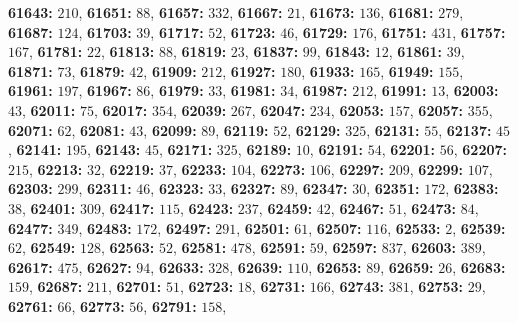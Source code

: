 \textsf{\bfseries 61643:} $210$, \textsf{\bfseries 61651:} $88$, \textsf{\bfseries 61657:} $332$, \textsf{\bfseries 61667:} $21$, \textsf{\bfseries 61673:} $136$, \textsf{\bfseries 61681:} $279$, \textsf{\bfseries 61687:} $124$, \textsf{\bfseries 61703:} $39$, \textsf{\bfseries 61717:} $52$, \textsf{\bfseries 61723:} $46$, \textsf{\bfseries 61729:} $176$, \textsf{\bfseries 61751:} $431$, \textsf{\bfseries 61757:} $167$, \textsf{\bfseries 61781:} $22$, \textsf{\bfseries 61813:} $88$, \textsf{\bfseries 61819:} $23$, \textsf{\bfseries 61837:} $99$, \textsf{\bfseries 61843:} $12$, \textsf{\bfseries 61861:} $39$, \textsf{\bfseries 61871:} $73$, \textsf{\bfseries 61879:} $42$, \textsf{\bfseries 61909:} $212$, \textsf{\bfseries 61927:} $180$, \textsf{\bfseries 61933:} $165$, \textsf{\bfseries 61949:} $155$, \textsf{\bfseries 61961:} $197$, \textsf{\bfseries 61967:} $86$, \textsf{\bfseries 61979:} $33$, \textsf{\bfseries 61981:} $34$, \textsf{\bfseries 61987:} $212$, \textsf{\bfseries 61991:} $13$, \textsf{\bfseries 62003:} $43$, \textsf{\bfseries 62011:} $75$, \textsf{\bfseries 62017:} $354$, \textsf{\bfseries 62039:} $267$, \textsf{\bfseries 62047:} $234$, \textsf{\bfseries 62053:} $157$, \textsf{\bfseries 62057:} $355$, \textsf{\bfseries 62071:} $62$, \textsf{\bfseries 62081:} $43$, \textsf{\bfseries 62099:} $89$, \textsf{\bfseries 62119:} $52$, \textsf{\bfseries 62129:} $325$, \textsf{\bfseries 62131:} $55$, \textsf{\bfseries 62137:} $45$, \textsf{\bfseries 62141:} $195$, \textsf{\bfseries 62143:} $45$, \textsf{\bfseries 62171:} $325$, \textsf{\bfseries 62189:} $10$, \textsf{\bfseries 62191:} $54$, \textsf{\bfseries 62201:} $56$, \textsf{\bfseries 62207:} $215$, \textsf{\bfseries 62213:} $32$, \textsf{\bfseries 62219:} $37$, \textsf{\bfseries 62233:} $104$, \textsf{\bfseries 62273:} $106$, \textsf{\bfseries 62297:} $209$, \textsf{\bfseries 62299:} $107$, \textsf{\bfseries 62303:} $299$, \textsf{\bfseries 62311:} $46$, \textsf{\bfseries 62323:} $33$, \textsf{\bfseries 62327:} $89$, \textsf{\bfseries 62347:} $30$, \textsf{\bfseries 62351:} $172$, \textsf{\bfseries 62383:} $38$, \textsf{\bfseries 62401:} $309$, \textsf{\bfseries 62417:} $115$, \textsf{\bfseries 62423:} $237$, \textsf{\bfseries 62459:} $42$, \textsf{\bfseries 62467:} $51$, \textsf{\bfseries 62473:} $84$, \textsf{\bfseries 62477:} $349$, \textsf{\bfseries 62483:} $172$, \textsf{\bfseries 62497:} $291$, \textsf{\bfseries 62501:} $61$, \textsf{\bfseries 62507:} $116$, \textsf{\bfseries 62533:} $2$, \textsf{\bfseries 62539:} $62$, \textsf{\bfseries 62549:} $128$, \textsf{\bfseries 62563:} $52$, \textsf{\bfseries 62581:} $478$, \textsf{\bfseries 62591:} $59$, \textsf{\bfseries 62597:} $837$, \textsf{\bfseries 62603:} $389$, \textsf{\bfseries 62617:} $475$, \textsf{\bfseries 62627:} $94$, \textsf{\bfseries 62633:} $328$, \textsf{\bfseries 62639:} $110$, \textsf{\bfseries 62653:} $89$, \textsf{\bfseries 62659:} $26$, \textsf{\bfseries 62683:} $159$, \textsf{\bfseries 62687:} $211$, \textsf{\bfseries 62701:} $51$, \textsf{\bfseries 62723:} $18$, \textsf{\bfseries 62731:} $166$, \textsf{\bfseries 62743:} $381$, \textsf{\bfseries 62753:} $29$, \textsf{\bfseries 62761:} $66$, \textsf{\bfseries 62773:} $56$, \textsf{\bfseries 62791:} $158$, 
